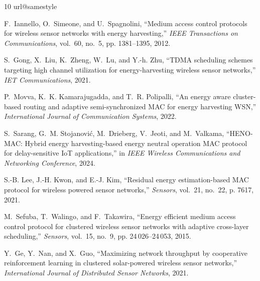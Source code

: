 \documentclass[journal]{IEEEtran}
\begin{document}
\begin{thebibliography}{10}
\providecommand{\url}[1]{#1}
\csname url@samestyle\endcsname
\providecommand{\newblock}{\relax}
\providecommand{\bibinfo}[2]{#2}
\providecommand{\BIBentrySTDinterwordspacing}{\spaceskip=0pt\relax}
\providecommand{\BIBentryALTinterwordstretchfactor}{4}
\providecommand{\BIBentryALTinterwordspacing}{\spaceskip=\fontdimen2\font plus
\BIBentryALTinterwordstretchfactor\fontdimen3\font minus
  \fontdimen4\font\relax}

F.~Iannello, O.~Simeone, and U.~Spagnolini, ``Medium access control protocols
  for wireless sensor networks with energy harvesting,'' \emph{IEEE
  Transactions on Communications}, vol.~60, no.~5, pp. 1381--1395, 2012.

S.~Gong, X.~Liu, K.~Zheng, W.~Lu, and Y.-h. Zhu, ``TDMA scheduling schemes
  targeting high channel utilization for energy-harvesting wireless sensor
  networks,'' \emph{IET Communications}, 2021.

P.~Movva, K.~K. Kamarajugadda, and T.~R. Polipalli, ``An energy aware
  cluster-based routing and adaptive semi-synchronized MAC for energy
  harvesting WSN,'' \emph{International Journal of Communication Systems},
  2022.

S.~Sarang, G.~M. Stojanovi{\'c}, M.~Drieberg, V.~Jeoti, and M.~Valkama,
  ``HENO-MAC: Hybrid energy harvesting-based energy neutral operation MAC
  protocol for delay-sensitive IoT applications,'' in \emph{IEEE Wireless
  Communications and Networking Conference}, 2024.

S.-B. Lee, J.-H. Kwon, and E.-J. Kim, ``Residual energy estimation-based MAC
  protocol for wireless powered sensor networks,'' \emph{Sensors}, vol.~21,
  no.~22, p. 7617, 2021.

M.~Sefuba, T.~Walingo, and F.~Takawira, ``Energy efficient medium access
  control protocol for clustered wireless sensor networks with adaptive
  cross-layer scheduling,'' \emph{Sensors}, vol.~15, no.~9, pp.
  24\,026--24\,053, 2015.

Y.~Ge, Y.~Nan, and X.~Guo, ``Maximizing network throughput by cooperative
  reinforcement learning in clustered solar-powered wireless sensor networks,''
  \emph{International Journal of Distributed Sensor Networks}, 2021.


\end{thebibliography}
\end{document}
